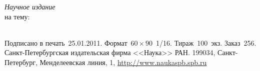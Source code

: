 \documentclass[%
autoref,     %
href,        %
facsimile,   %
colorlinks,  %
]{disser}
\begin{document}

\printbibheading[title={Основные публикации по теме диссертации}]
\printbibliography[
heading=subbibliography,
keyword=hac,
title={Статьи в изданиях из перечня ВАК, SCOPUS}
]

\printbibliography[
heading=subbibliography,
keyword=nohac,
title={Другие публикации}
]

\clearpage
\thispagestyle{empty}
\normalfont\selectfont
\vspace*{2cm}
\begin{center}
\textit{Научное издание}\\
\vskip 2cm
\makeatletter
\@author
\vskip 1.5cm
\@title{} на тему:\\
\@topic\\
\makeatother
\end{center}
\vfill
Подписано в печать~25.01.2011.
Формат~$60 \times 90$~1/16.
Тираж~100~экз.
Заказ~256.\\[2ex]
\noindent
Санкт-Петербургская издательская фирма <<Наука>> РАН.
199034, Санкт-Петербург, Менделеевская линия, 1,
\href{http://www.naukaspb.spb.ru}{http://www.naukaspb.spb.ru}
\end{document}
